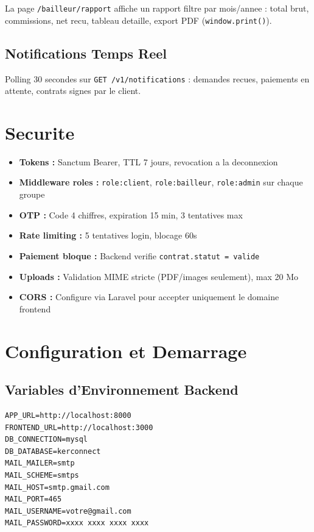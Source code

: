 \documentclass[12pt,a4paper]{article}
\begin{document}
La page \texttt{/bailleur/rapport} affiche un rapport filtre par mois/annee :
total brut, commissions, net recu, tableau detaille, export PDF (\texttt{window.print()}).

\subsection{Notifications Temps Reel}

Polling 30 secondes sur \texttt{GET /v1/notifications} :
demandes recues, paiements en attente, contrats signes par le client.

\section{Securite}

\begin{itemize}
  \item \textbf{Tokens :} Sanctum Bearer, TTL 7 jours, revocation a la deconnexion
  \item \textbf{Middleware roles :} \texttt{role:client}, \texttt{role:bailleur}, \texttt{role:admin} sur chaque groupe
  \item \textbf{OTP :} Code 4 chiffres, expiration 15 min, 3 tentatives max
  \item \textbf{Rate limiting :} 5 tentatives login, blocage 60s
  \item \textbf{Paiement bloque :} Backend verifie \texttt{contrat.statut = valide}
  \item \textbf{Uploads :} Validation MIME stricte (PDF/images seulement), max 20 Mo
  \item \textbf{CORS :} Configure via Laravel pour accepter uniquement le domaine frontend
\end{itemize}

\section{Configuration et Demarrage}

\subsection{Variables d'Environnement Backend}

\begin{lstlisting}[caption=backend/.env (extrait)]
APP_URL=http://localhost:8000
FRONTEND_URL=http://localhost:3000
DB_CONNECTION=mysql
DB_DATABASE=kerconnect
MAIL_MAILER=smtp
MAIL_SCHEME=smtps
MAIL_HOST=smtp.gmail.com
MAIL_PORT=465
MAIL_USERNAME=votre@gmail.com
MAIL_PASSWORD=xxxx xxxx xxxx xxxx
\end{lstlisting}
\end{document}

